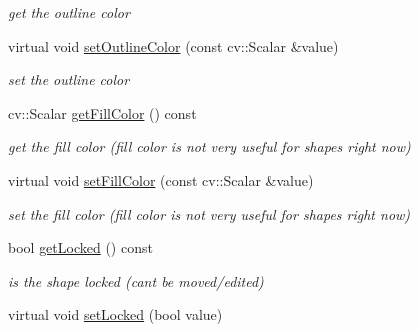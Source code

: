 \begin{DoxyCompactItemize}
\begin{DoxyCompactList}\small\item\em get the outline color \end{DoxyCompactList}\item 
virtual void \hyperlink{classcanvascv_1_1Shape_adc79bf6f5d81954d743bb255043784f0}{set\+Outline\+Color} (const cv\+::\+Scalar \&value)\hypertarget{classcanvascv_1_1Shape_adc79bf6f5d81954d743bb255043784f0}{}\label{classcanvascv_1_1Shape_adc79bf6f5d81954d743bb255043784f0}

\begin{DoxyCompactList}\small\item\em set the outline color \end{DoxyCompactList}\item 
cv\+::\+Scalar \hyperlink{classcanvascv_1_1Shape_a057f3ea47ffc60678feaa663b375ce27}{get\+Fill\+Color} () const \hypertarget{classcanvascv_1_1Shape_a057f3ea47ffc60678feaa663b375ce27}{}\label{classcanvascv_1_1Shape_a057f3ea47ffc60678feaa663b375ce27}

\begin{DoxyCompactList}\small\item\em get the fill color (fill color is not very useful for shapes right now) \end{DoxyCompactList}\item 
virtual void \hyperlink{classcanvascv_1_1Shape_aee4961631c033ff309e8993c0a8f57b0}{set\+Fill\+Color} (const cv\+::\+Scalar \&value)\hypertarget{classcanvascv_1_1Shape_aee4961631c033ff309e8993c0a8f57b0}{}\label{classcanvascv_1_1Shape_aee4961631c033ff309e8993c0a8f57b0}

\begin{DoxyCompactList}\small\item\em set the fill color (fill color is not very useful for shapes right now) \end{DoxyCompactList}\item 
bool \hyperlink{classcanvascv_1_1Shape_ad343afbb7312ed40e51abefb166cf3dd}{get\+Locked} () const \hypertarget{classcanvascv_1_1Shape_ad343afbb7312ed40e51abefb166cf3dd}{}\label{classcanvascv_1_1Shape_ad343afbb7312ed40e51abefb166cf3dd}

\begin{DoxyCompactList}\small\item\em is the shape locked (can\textquotesingle{}t be moved/edited) \end{DoxyCompactList}\item 
virtual void \hyperlink{classcanvascv_1_1Shape_a3d777d9ff2724ff61c30f45c526354a4}{set\+Locked} (bool value)\hypertarget{classcanvascv_1_1Shape_a3d777d9ff2724ff61c30f45c526354a4}{}\label{classcanvascv_1_1Shape_a3d777d9ff2724ff61c30f45c526354a4}


\end{DoxyCompactItemize}
